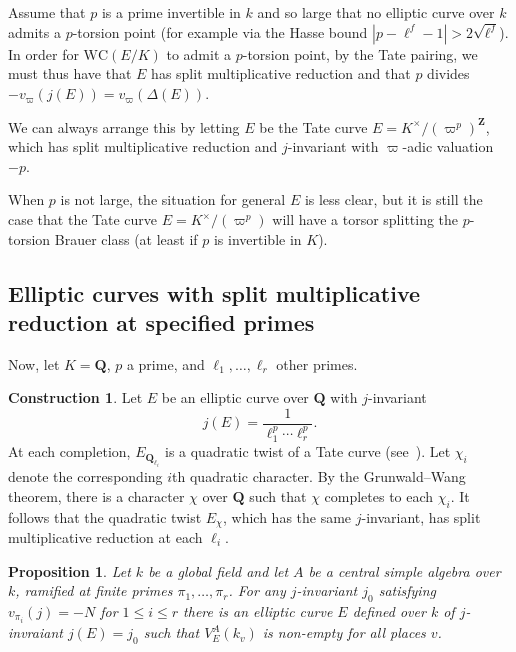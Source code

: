 \documentclass[10pt,letterpaper,twoside]{article}
\renewcommand{\1}{\mathbf{1}}
\newcommand{\bQ}{\mathbf{Q}}
\newcommand{\bZ}{\mathbf{Z}}
\newcommand{\WC}{\mathrm{WC}}
\renewcommand{\leq}{\leqslant}
\theoremstyle{plain}
\newtheorem{proposition}[theorem]{Proposition}
\theoremstyle{plain}
\theoremstyle{definition}
\theoremstyle{named}
\theoremstyle{definition}
\newtheorem{construction}[theorem]{Construction}
\begin{document}
	Assume that $p$ is a prime invertible in $k$ and so large that no elliptic curve over $k$ admits
	a $p$-torsion point (for example via the Hasse bound $|p-\ell^f-1|>2\sqrt{\ell^f}$).
	In order for $\WC(E/K)$ to admit a $p$-torsion point, by the Tate pairing, we must thus have that
	$E$ has split multiplicative
	reduction and that $p$ divides $-v_{\varpi}(j(E))=v_\varpi(\Delta(E))$.
	
	We can always arrange this by letting $E$ be the Tate curve
	$E=K^\times/(\varpi^p)^{\bZ}$, which has split multiplicative reduction
	and $j$-invariant with $\varpi$-adic valuation $-p$.
	
	When $p$ is not large, the situation for general $E$ is less clear, but it is still the case that the Tate curve
	$E=K^\times/(\varpi^p)$ will have a torsor splitting the $p$-torsion Brauer class (at least if $p$
	is invertible in $K$).
	
	
	
	\subsection{Elliptic curves with split multiplicative reduction at specified primes}
	
	Now, let $K=\bQ$, $p$ a prime, and $\ell_1,\ldots,\ell_r$ other primes.
	
	\begin{construction}\label{const:multiplicative}
		Let $E$ be an elliptic curve over $\bQ$ with $j$-invariant
		$$j(E)=\frac{1}{\ell_1^p\cdots\ell_r^p}.$$
		At each completion, $E_{\bQ_{\ell_i}}$ is a quadratic twist of a Tate curve
		(see~\cite[Thm.~C.14.1]{silverman}). Let $\chi_i$ denote the corresponding $i$th quadratic character. By the
		Grunwald--Wang theorem, there is a character $\chi$ over $\bQ$ such that $\chi$ completes to
		each $\chi_i$. It follows that the quadratic twist $E_\chi$, which has the same $j$-invariant,
		has split multiplicative reduction at each $\ell_i$.
	\end{construction}
	
	\begin{proposition}
		Let $k$ be a global field and let $A$ be a central simple algebra over $k$, ramified at finite
		primes $\pi_1,\ldots,\pi_r$. For any $j$-invariant $j_0$ satisfying
		$v_{\pi_i}(j)=-N$ for $1\leq i\leq r$ there is an elliptic curve $E$ defined over $k$ of
		$j$-invraiant $j(E)=j_0$ such that $V_E^A(k_v)$ is non-empty for all places $v$.
	\end{proposition}
	
\end{document}
